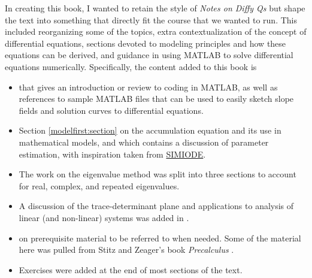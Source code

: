 In creating this book, I wanted to retain the style of \emph{Notes on Diffy Qs} \cite{JL} but shape the text into something that directly fit the course that we wanted to run. This included reorganizing some of the topics, extra contextualization of the concept of differential equations, sections devoted to modeling principles and how these equations can be derived, and guidance in using MATLAB to solve differential equations numerically. Specifically, the content added to this book is
\begin{itemize}
\item {} that gives an introduction or review to coding in MATLAB, as well as references to sample MATLAB files that can be used to easily sketch slope fields and solution curves to differential equations.
\item Section \ref{modelfirst:section} on the accumulation equation and its use in mathematical models, and  which contains a discussion of parameter estimation, with inspiration taken from \href{https://www.simiode.org/}{SIMIODE}.
\item The work on the eigenvalue method was split into three sections to account for real, complex, and repeated eigenvalues. 
\item A discussion of the trace-determinant plane and applications to analysis of linear (and non-linear) systems was added in .
\item {} on prerequisite material to be referred to when needed. Some of the material here was pulled from Stitz and Zeager's book \emph{Precalculus} \cite{SZ}.
\item Exercises were added at the end of most sections of the text.
\end{itemize}


